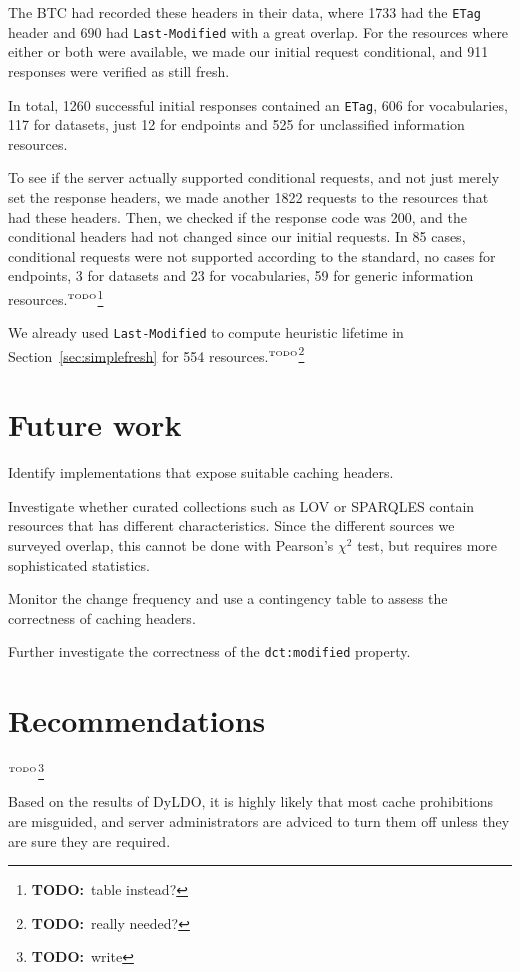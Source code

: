 \documentclass{llncs}
\newcommand{\rdfterm}[1]{\texttt{#1}}
\newcommand{\httph}[1]{\texttt{#1}}
\newcommand{\todo}[1]{\ensuremath{^{\textrm{\tiny{TODO}\normalsize}}}\footnote{\textbf{TODO:}~#1}}
\begin{document}
The BTC had recorded these headers in their data, where 1733 had the
\httph{ETag} header and 690 had \httph{Last-Modified} with a great
overlap. For the resources where either or both were available, we
made our initial request conditional, and 911 responses were verified
as still fresh. 

In total, 1260 successful initial responses contained
an \httph{ETag}, 606 for vocabularies, 117 for datasets, just 12 for
endpoints and 525 for unclassified information resources.

To see if the server actually supported conditional requests, and not
just merely set the response headers, we made another 1822 requests to
the resources that had these headers. Then, we checked if the response
code was 200, and the conditional headers had not changed since our
initial requests. In 85 cases, conditional requests were not supported
according to the standard, no cases for endpoints, 3 for datasets and
23 for vocabularies, 59 for generic information resources.\todo{table instead?}


We already used \httph{Last-Modified} to compute heuristic lifetime
in Section~\ref{sec:simplefresh} for 554 resources.\todo{really needed?}



\section{Future work}

Identify implementations that expose suitable caching headers.

Investigate whether curated collections such as LOV or SPARQLES
contain resources that has different characteristics. Since the
different sources we surveyed overlap, this cannot be done with
Pearson's $\chi^2$ test, but requires more sophisticated statistics.

Monitor the change frequency and use a contingency table to assess the
correctness of caching headers.

Further investigate the correctness of the \rdfterm{dct:modified} property.

\section{Recommendations}\todo{write}

Based on the results of DyLDO, it is highly likely that most cache
prohibitions are misguided, and server administrators are adviced to
turn them off unless they are sure they are required.
\end{document}
